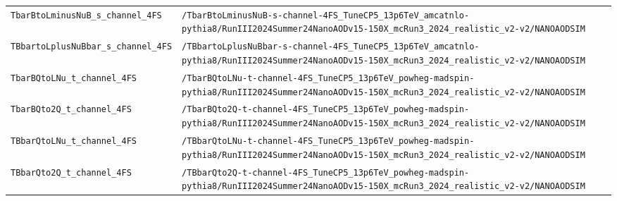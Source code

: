 \begin{longtable}{@{}>{\RaggedRight\arraybackslash}p{} >{\RaggedRight\arraybackslash}p{}@{}}
\addlinespace[2pt]
\texttt{TbarBtoLminusNuB\_\allowbreak{}s\_\allowbreak{}channel\_\allowbreak{}4FS} & \texttt{/\allowbreak{}TbarBtoLminusNuB-\allowbreak{}s-\allowbreak{}channel-\allowbreak{}4FS\_\allowbreak{}TuneCP5\_\allowbreak{}13p6TeV\_\allowbreak{}amcatnlo-\allowbreak{}pythia8/\allowbreak{}RunIII2024Summer24NanoAODv15-\allowbreak{}150X\_\allowbreak{}mcRun3\_\allowbreak{}2024\_\allowbreak{}realistic\_\allowbreak{}v2-\allowbreak{}v2/\allowbreak{}NANOAODSIM} \\
\addlinespace[2pt]
\texttt{TBbartoLplusNuBbar\_\allowbreak{}s\_\allowbreak{}channel\_\allowbreak{}4FS} & \texttt{/\allowbreak{}TBbartoLplusNuBbar-\allowbreak{}s-\allowbreak{}channel-\allowbreak{}4FS\_\allowbreak{}TuneCP5\_\allowbreak{}13p6TeV\_\allowbreak{}amcatnlo-\allowbreak{}pythia8/\allowbreak{}RunIII2024Summer24NanoAODv15-\allowbreak{}150X\_\allowbreak{}mcRun3\_\allowbreak{}2024\_\allowbreak{}realistic\_\allowbreak{}v2-\allowbreak{}v2/\allowbreak{}NANOAODSIM} \\
\addlinespace[2pt]
\texttt{TbarBQtoLNu\_\allowbreak{}t\_\allowbreak{}channel\_\allowbreak{}4FS} & \texttt{/\allowbreak{}TbarBQtoLNu-\allowbreak{}t-\allowbreak{}channel-\allowbreak{}4FS\_\allowbreak{}TuneCP5\_\allowbreak{}13p6TeV\_\allowbreak{}powheg-\allowbreak{}madspin-\allowbreak{}pythia8/\allowbreak{}RunIII2024Summer24NanoAODv15-\allowbreak{}150X\_\allowbreak{}mcRun3\_\allowbreak{}2024\_\allowbreak{}realistic\_\allowbreak{}v2-\allowbreak{}v2/\allowbreak{}NANOAODSIM} \\
\addlinespace[2pt]
\texttt{TbarBQto2Q\_\allowbreak{}t\_\allowbreak{}channel\_\allowbreak{}4FS} & \texttt{/\allowbreak{}TbarBQto2Q-\allowbreak{}t-\allowbreak{}channel-\allowbreak{}4FS\_\allowbreak{}TuneCP5\_\allowbreak{}13p6TeV\_\allowbreak{}powheg-\allowbreak{}madspin-\allowbreak{}pythia8/\allowbreak{}RunIII2024Summer24NanoAODv15-\allowbreak{}150X\_\allowbreak{}mcRun3\_\allowbreak{}2024\_\allowbreak{}realistic\_\allowbreak{}v2-\allowbreak{}v2/\allowbreak{}NANOAODSIM} \\
\addlinespace[2pt]
\texttt{TBbarQtoLNu\_\allowbreak{}t\_\allowbreak{}channel\_\allowbreak{}4FS} & \texttt{/\allowbreak{}TBbarQtoLNu-\allowbreak{}t-\allowbreak{}channel-\allowbreak{}4FS\_\allowbreak{}TuneCP5\_\allowbreak{}13p6TeV\_\allowbreak{}powheg-\allowbreak{}madspin-\allowbreak{}pythia8/\allowbreak{}RunIII2024Summer24NanoAODv15-\allowbreak{}150X\_\allowbreak{}mcRun3\_\allowbreak{}2024\_\allowbreak{}realistic\_\allowbreak{}v2-\allowbreak{}v2/\allowbreak{}NANOAODSIM} \\
\addlinespace[2pt]
\texttt{TBbarQto2Q\_\allowbreak{}t\_\allowbreak{}channel\_\allowbreak{}4FS} & \texttt{/\allowbreak{}TBbarQto2Q-\allowbreak{}t-\allowbreak{}channel-\allowbreak{}4FS\_\allowbreak{}TuneCP5\_\allowbreak{}13p6TeV\_\allowbreak{}powheg-\allowbreak{}madspin-\allowbreak{}pythia8/\allowbreak{}RunIII2024Summer24NanoAODv15-\allowbreak{}150X\_\allowbreak{}mcRun3\_\allowbreak{}2024\_\allowbreak{}realistic\_\allowbreak{}v2-\allowbreak{}v2/\allowbreak{}NANOAODSIM} \\

\end{longtable}
